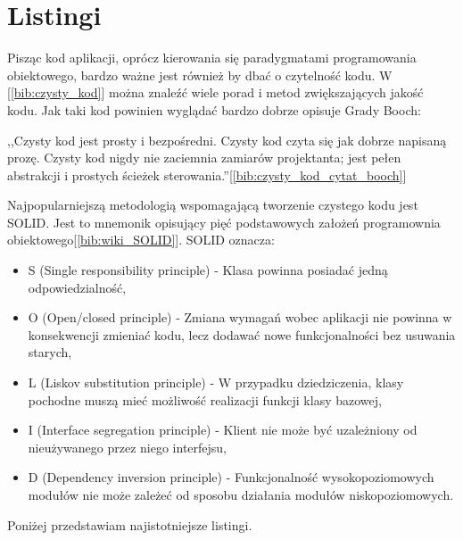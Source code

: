 \section{Listingi}
Pisząc kod aplikacji, oprócz kierowania się paradygmatami programowania obiektowego, bardzo ważne jest również by dbać o czytelność kodu. W [\ref{bib:czysty_kod}] można znaleźć wiele porad i metod zwiększających jakość kodu. Jak taki kod powinien wyglądać bardzo dobrze opisuje Grady Booch:
\begin{center}
	,,Czysty kod jest prosty i bezpośredni. Czysty kod czyta się jak dobrze napisaną prozę. Czysty kod nigdy nie zaciemnia zamiarów projektanta; jest pełen abstrakcji i prostych ścieżek sterowania.''[\ref{bib:czysty_kod_cytat_booch}]
\end{center}
Najpopularniejszą metodologią wspomagającą tworzenie czystego kodu jest SOLID. Jest to mnemonik opisujący pięć podstawowych założeń programownia obiektowego[\ref{bib:wiki_SOLID}]. SOLID oznacza:
\begin{itemize}
	\item S (Single responsibility principle) - Klasa powinna posiadać jedną odpowiedzialność,
	\item O (Open/closed principle) - Zmiana wymagań wobec aplikacji nie powinna w konsekwencji zmieniać kodu, lecz dodawać nowe funkcjonalności bez usuwania starych,
	\item L (Liskov substitution principle) - W przypadku dziedziczenia, klasy pochodne muszą mieć możliwość realizacji funkcji klasy bazowej,
	\item I (Interface segregation principle) - Klient nie może być uzależniony od nieużywanego przez niego interfejsu,
	\item D (Dependency inversion principle) - Funkcjonalność wysokopoziomowych modułów nie może zależeć od sposobu działania modułów niskopoziomowych.
\end{itemize}

Poniżej przedstawiam najistotniejsze listingi.

